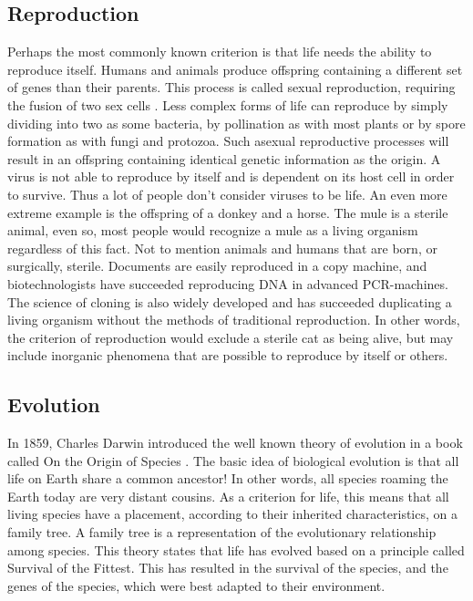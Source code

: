 \subsection{Reproduction}
Perhaps the most commonly known criterion is that life needs the ability to reproduce itself.
Humans and animals produce offspring containing a different set of genes than their parents.
This process is called sexual reproduction, requiring the fusion of two sex cells \cite{reprod}.
Less complex forms of life can reproduce by simply dividing into two as some bacteria, by pollination as with most plants or by spore formation as with fungi and protozoa.
Such asexual reproductive processes will result in an offspring containing identical genetic information as the origin.
A virus is not able to reproduce by itself and is dependent on its host cell in order to survive.
Thus a lot of people don't consider viruses to be life.
An even more extreme example is the offspring of a donkey and a horse.
The mule is a sterile animal, even so, most people would recognize a mule as a living organism regardless of this fact. 
Not to mention animals and humans that are born, or surgically, sterile.
Documents are easily reproduced in a copy machine, and biotechnologists have succeeded reproducing DNA in advanced PCR-machines.
The science of cloning is also widely developed and has succeeded duplicating a living organism without the methods of traditional reproduction.
In other words, the criterion of reproduction would exclude a sterile cat as being alive, but may include inorganic phenomena that are possible to reproduce by itself or others.

\subsection{Evolution}
In 1859, Charles Darwin introduced the well known theory of evolution in a book called On the Origin of Species \cite{Darwin}.
The basic idea of biological evolution is that all life on Earth share a common ancestor!
In other words, all species roaming the Earth today are very distant cousins.
As a criterion for life, this means that all living species have a placement, according to their inherited characteristics, on a family tree.
A family tree is a representation of the evolutionary relationship among species.
This theory states that life has evolved based on a principle called Survival of the Fittest.
This has resulted in the survival of the species, and the genes of the species, which were best adapted to their environment. 


